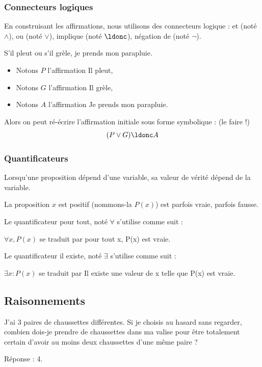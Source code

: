 \documentclass[french,xcolor=svgnames]{beamer}
\begin{document}
\begin{frame}
  \frametitle{Connecteurs logiques}
  En construisant les affirmations, nous utilisons des connecteurs logique : \og et\fg{} (noté \(\land\)), \og ou\fg{} (noté \(\lor\)), \og implique\fg{} (noté \(\ldonc\)), \og négation de\fg{} (noté $\neg$).\pause{}

  \begin{example}
    S'il pleut ou s'il grèle, je prends mon parapluie.\pause

    \begin{itemize}[<+->]
    \item Notons \(P\) l'affirmation \og Il pleut\fg{},
    \item Notons \(G\) l'affirmation \og Il grèle\fg{},
    \item Notons \(A\) l'affirmation \og Je prends mon parapluie\fg{}.
    \end{itemize}\pause
    Alors on peut ré-écrire l'affirmation initiale sous forme symbolique  :\pause{} (le faire !)\pause{}
    \begin{equation*}
      (P \lor G) \ldonc A
    \end{equation*}
  \end{example}
\end{frame}
\begin{frame}
  \frametitle{Quantificateurs}
  Lorsqu'une proposition dépend d'une variable, sa valeur de vérité dépend de la variable.\pause{}

  \begin{example}
    La proposition \og $x$ est positif\fg\pause{} (nommons-la $P(x)$)\pause{} est parfois vraie, parfois fausse.\pause{}
  \end{example}

  Le quantificateur \og pour tout\fg{}, noté $\forall$ s'utilise comme suit :\pause{}
  \begin{center}
    $\forall x, P(x)$ se traduit par \og pour tout x, P(x) est vraie\fg{}.
  \end{center}\pause{}

  Le quantificateur \og il existe\fg{}, noté $\exists$ s'utilise comme suit :\pause{}
  \begin{center}
    $\exists x : P(x)$ se traduit par \og Il existe une valeur de x telle que P(x) est vraie\fg{}.
  \end{center}\pause{}
\end{frame}


\subsection{Raisonnements}
\begin{frame}
  \begin{example}
    J'ai 3 paires de chaussettes différentes.\pause{} Si je choisis au hasard sans regarder,\pause{} combien dois-je prendre de chaussettes dans ma valise\pause{} pour être totalement certain d'avoir au moins deux chaussettes d'une même paire ?\pause{}

    Réponse : \pause{} 4.
  \end{example}
\end{frame}
\end{document}
